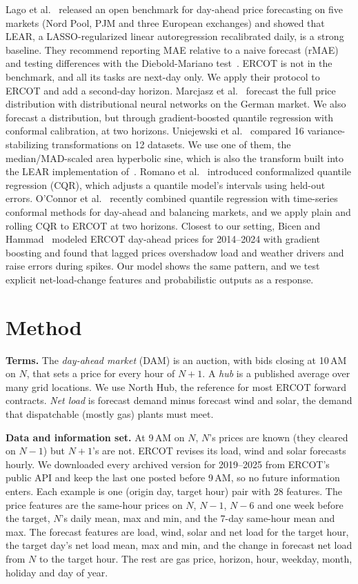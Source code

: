 \documentclass[11pt]{article}
\begin{document}
Lago et al.~\cite{lago} released an open benchmark for day-ahead price forecasting on five markets (Nord Pool, PJM and three European exchanges) and showed that LEAR, a LASSO-regularized linear autoregression recalibrated daily, is a strong baseline. They recommend reporting MAE relative to a naive forecast (rMAE) and testing differences with the Diebold-Mariano test~\cite{dm}. ERCOT is not in the benchmark, and all its tasks are next-day only. We apply their protocol to ERCOT and add a second-day horizon. Marcjasz et al.~\cite{marcjasz} forecast the full price distribution with distributional neural networks on the German market. We also forecast a distribution, but through gradient-boosted quantile regression with conformal calibration, at two horizons. Uniejewski et al.~\cite{vst} compared 16 variance-stabilizing transformations on 12 datasets. We use one of them, the median/MAD-scaled area hyperbolic sine, which is also the transform built into the LEAR implementation of~\cite{lago}. Romano et al.~\cite{cqr} introduced conformalized quantile regression (CQR), which adjusts a quantile model's intervals using held-out errors. O'Connor et al.~\cite{oconnor} recently combined quantile regression with time-series conformal methods for day-ahead and balancing markets, and we apply plain and rolling CQR to ERCOT at two horizons. Closest to our setting, Bicen and Hammad~\cite{bicen} modeled ERCOT day-ahead prices for 2014--2024 with gradient boosting and found that lagged prices overshadow load and weather drivers and raise errors during spikes. Our model shows the same pattern, and we test explicit net-load-change features and probabilistic outputs as a response.

\section{Method}

\textbf{Terms.} The \emph{day-ahead market} (DAM) is an auction, with bids closing at 10\,AM on $N$, that sets a price for every hour of $N{+}1$. A \emph{hub} is a published average over many grid locations. We use North Hub, the reference for most ERCOT forward contracts. \emph{Net load} is forecast demand minus forecast wind and solar, the demand that dispatchable (mostly gas) plants must meet.

\textbf{Data and information set.} At 9\,AM on $N$, $N$'s prices are known (they cleared on $N{-}1$) but $N{+}1$'s are not. ERCOT revises its load, wind and solar forecasts hourly. We downloaded every archived version for 2019--2025 from ERCOT's public API and keep the last one posted before 9\,AM, so no future information enters. Each example is one (origin day, target hour) pair with 28 features. The price features are the same-hour prices on $N$, $N{-}1$, $N{-}6$ and one week before the target, $N$'s daily mean, max and min, and the 7-day same-hour mean and max. The forecast features are load, wind, solar and net load for the target hour, the target day's net load mean, max and min, and the change in forecast net load from $N$ to the target hour. The rest are gas price, horizon, hour, weekday, month, holiday and day of year.
\end{document}
